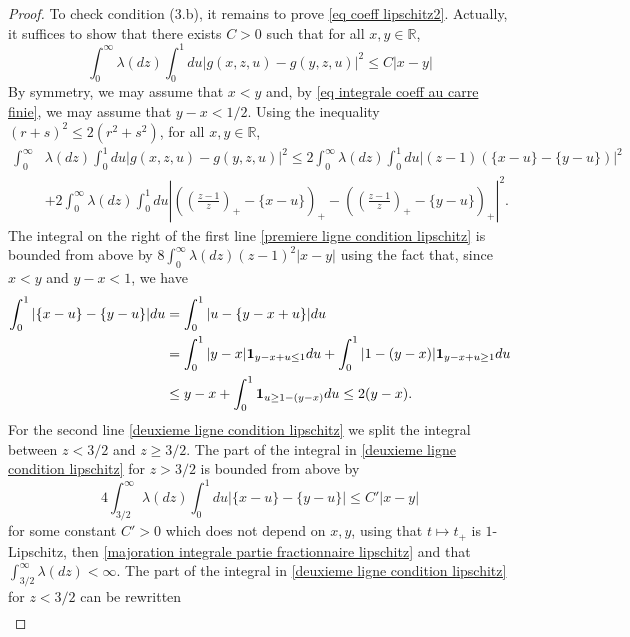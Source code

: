 \documentclass[11pt]{article}
\numberwithin{equation}{section}
\def \R{\mathbb {R}}
\begin{document}
\begin{proof}
	To check condition (3.b), it remains to prove \eqref{eq coeff lipschitz2}. Actually, it suffices to show that there exists $C>0$ such that for all $x, y \in \R$, 
	\begin{equation}\label{eq coeff lipschitz}
		\int_{0}^\infty \lambda(dz) \int_0^1du \left\vert g(x,z,u)-g(y,z,u)\right\vert^2 \le C \vert x-y \vert
	\end{equation}
	 By symmetry, we may assume that $x<y$ and, by \eqref{eq integrale coeff au carre finie}, we may assume that $y-x<1/2$. Using the inequality $(r+s)^2 \le 2(r^2+s^2)$, for all $x,y \in \R$,
	\begin{align}
		\int_{0}^\infty &\lambda(dz) \int_0^1du \left\vert g(x,z,u)-g(y,z,u)\right\vert^2
		\le  2\int_0^\infty \lambda(dz) \int_0^1 du \left\vert (z-1)\left(\{x-u\}-\{y-u\}\right)\right\vert^2\label{premiere ligne condition lipschitz}\\
		&+ 2	\int_{0}^\infty \lambda(dz) \int_0^1du\left\vert \left( \left(\frac{z-1}{z}\right)_+-\{x-u\}\right)_+-\left( \left(\frac{z-1}{z}\right)_+-\{y-u\}\right)_+ \right\vert^2.\label{deuxieme ligne condition lipschitz}
	\end{align}
	The integral on the right of the first line \eqref{premiere ligne condition lipschitz} is {bounded from above} by $8\int_0^\infty \lambda(dz) (z-1)^2 \vert x-y \vert$ using the fact that, since $x<y$ and $y-x<1$, we have
	\begin{align}
	\int_0^1  \vert \{x-u\} - \{y-u\} \vert du &= \int_0^1  \vert u- \{y-x+u\} \vert du \notag\\
	&= \int_0^1  \vert y-x \vert {\bf 1}_{y-x+u \le 1} du + \int_0^1  \vert 1- (y-x) \vert {\bf 1}_{y-x+u \ge 1} du\notag\\
	&\le y-x   + \int_0^1  {\bf 1}_{u \ge 1-(y-x)} du \le 2 (y-x)\label{majoration integrale partie fractionnaire lipschitz}.
\end{align}
For the second line \eqref{deuxieme ligne condition lipschitz} we split the integral between $z<3/2$ and $z\ge 3/2$. The part of the integral in \eqref{deuxieme ligne condition lipschitz} for $z>3/2$ is {bounded from above} by
$$
4 \int_{3/2}^\infty \lambda(dz) \int_0^1 du \vert \{x-u\}-\{y-u\} \vert \le C' \vert x-y \vert
$$
for some constant $C'>0$ which does not depend on $x,y$, using that $t\mapsto t_+$ is $1$-Lipschitz, then \eqref{majoration integrale partie fractionnaire lipschitz} and that $\int_{3/2}^\infty \lambda(dz) <\infty$.
 The part of the integral in \eqref{deuxieme ligne condition lipschitz} for $z<3/2$ can be rewritten
	\begin{align}

\end{align}
\end{proof}
\end{document}
